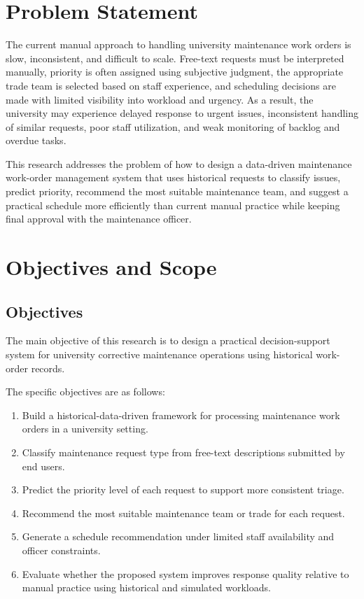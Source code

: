 \documentclass[11pt,a4paper]{report}
\begin{document}
\section{Problem Statement}
The current manual approach to handling university maintenance work orders is slow, inconsistent, and difficult to scale. Free-text requests must be interpreted manually, priority is often assigned using subjective judgment, the appropriate trade team is selected based on staff experience, and scheduling decisions are made with limited visibility into workload and urgency. As a result, the university may experience delayed response to urgent issues, inconsistent handling of similar requests, poor staff utilization, and weak monitoring of backlog and overdue tasks.

This research addresses the problem of how to design a data-driven maintenance work-order management system that uses historical requests to classify issues, predict priority, recommend the most suitable maintenance team, and suggest a practical schedule more efficiently than current manual practice while keeping final approval with the maintenance officer.

\section{Objectives and Scope}
\subsection{Objectives}
The main objective of this research is to design a practical decision-support system for university corrective maintenance operations using historical work-order records.

The specific objectives are as follows:
\begin{enumerate}[label=\arabic*.]
    \item Build a historical-data-driven framework for processing maintenance work orders in a university setting.
    \item Classify maintenance request type from free-text descriptions submitted by end users.
    \item Predict the priority level of each request to support more consistent triage.
    \item Recommend the most suitable maintenance team or trade for each request.
    \item Generate a schedule recommendation under limited staff availability and officer constraints.
    \item Evaluate whether the proposed system improves response quality relative to manual practice using historical and simulated workloads.
\end{enumerate}
\end{document}
